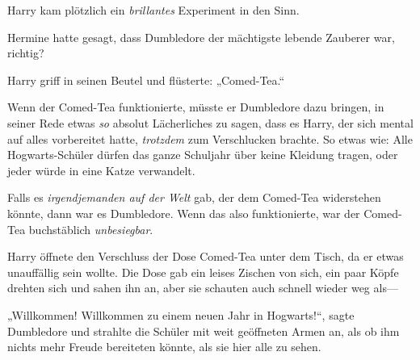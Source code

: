 Harry kam plötzlich ein \emph{brillantes} Experiment in den Sinn.

Hermine hatte gesagt, dass Dumbledore der mächtigste lebende Zauberer war, richtig?

Harry griff in seinen Beutel und flüsterte: „Comed-Tea.“

Wenn der Comed-Tea funktionierte, müsste er Dumbledore dazu bringen, in seiner Rede etwas \emph{so} absolut Lächerliches zu sagen, dass es Harry, der sich mental auf alles vorbereitet hatte, \emph{trotzdem} zum Verschlucken brachte. So etwas wie: Alle Hogwarts-Schüler dürfen das ganze Schuljahr über keine Kleidung tragen, oder jeder würde in eine Katze verwandelt.

Falls es \emph{irgendjemanden auf der Welt} gab, der dem Comed-Tea widerstehen könnte, dann war es Dumbledore. Wenn das also funktionierte, war der Comed-Tea buchstäblich \emph{unbesiegbar}.

Harry öffnete den Verschluss der Dose Comed-Tea unter dem Tisch, da er etwas unauffällig sein wollte. Die Dose gab ein leises Zischen von sich, ein paar Köpfe drehten sich und sahen ihn an, aber sie schauten auch schnell wieder weg als—

„Willkommen! Willkommen zu einem neuen Jahr in Hogwarts!“, sagte Dumbledore und strahlte die Schüler mit weit geöffneten Armen an, als ob ihm nichts mehr Freude bereiteten könnte, als sie hier alle zu sehen.

